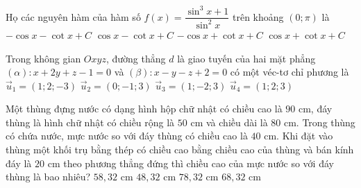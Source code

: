 \begin{ex}%
	Họ các nguyên hàm của hàm số $ f(x)=\dfrac{\sin^3x+1}{\sin^2x}$ trên khoảng $\left(0;\pi\right)$ là
	\choice
	{\True $-\cos x-\cot x+C$}
	{$\cos x-\cot x+C$}
	{$-\cos x+\cot x+C$}
	{$\cos x+\cot x+C$}
\end{ex}

\begin{ex}%
	Trong không gian $ Oxyz$, đường thẳng $d$ là giao tuyến của hai mặt phẳng $\left(\alpha\right)\colon x+2y+z-1=0$ và $\left(\beta\right)\colon x-y-z+2=0$ có một véc-tơ chỉ phương là
	\choice
	{$\vec u_1=\left(1;2;-3\right)$}
	{$\vec u_2=\left(0;-1;3\right)$}
	{\True $\vec u_3=\left(1;-2;3\right)$}
	{$\vec u_4=\left(1;2;3\right)$}
\end{ex}
%
\begin{ex}%
	Một thùng đựng nước có dạng hình hộp chữ nhật có chiều cao là $90$ cm, đáy thùng là hình chữ nhật có chiều rộng là $50$ cm và chiều dài là $80$ cm. Trong thùng có chứa nước, mực nước so với đáy thùng có chiều cao là $40$ cm. Khi đặt vào thùng một khối trụ bằng thép có chiều cao bằng chiều cao của thùng và bán kính đáy là $20$ cm theo phương thẳng đứng thì chiều cao của mực nước so với đáy thùng là bao nhiêu?
	\choice
	{\True $58{,}32$ cm}
	{$48{,}32$ cm}
	{$78{,}32$ cm}
	{$68{,}32$ cm}
\end{ex}
